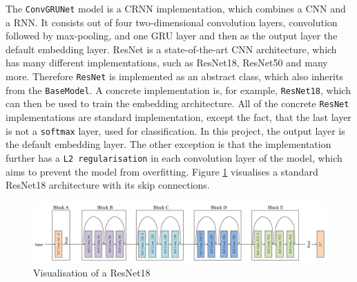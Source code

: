 \newline
\newline
The \texttt{ConvGRUNet} model is a \gls{CRNN} implementation, which combines a \gls{CNN} and a \gls{RNN}. It consists out of four two-dimensional convolution layers, convolution followed by max-pooling, and one \gls{GRU} layer and then as the output layer the default embedding layer.
\newline
\newline
ResNet is a state-of-the-art \gls{CNN} architecture, which has many different implementations, such as ResNet18, ResNet50 and many more. Therefore \texttt{ResNet} is implemented as an abstract class, which also inherits from the \texttt{BaseModel}. A concrete implementation is, for example, \texttt{ResNet18}, which can then be used to train the embedding architecture. All of the concrete \texttt{ResNet} implementations are standard implementation, except the fact, that the last layer is not a \texttt{softmax} layer, used for classification. In this project, the output layer is the default embedding layer. The other exception is that the implementation further has a \texttt{L2 regularisation} in each convolution layer of the model, which aims to prevent the model from overfitting. Figure \ref{fig:ResNet18} visualises a standard ResNet18 architecture with its skip connections.
\begin{figure}[htbp]
	\centering
	\includegraphics[width=\linewidth]{img/ResNet18.png}
	\caption[Visualisation of a ResNet18]{Visualisation of a ResNet18 \footnotemark}
	\label{fig:ResNet18}
\end{figure}

